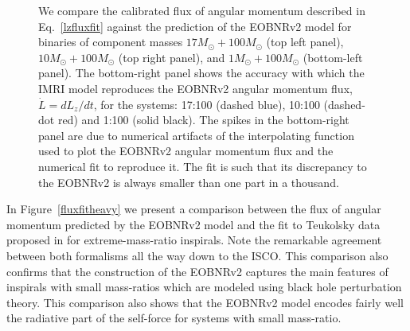 \begin{figure}[ht]
\caption{We compare the calibrated flux of angular momentum described in Eq.~\eqref{lzfluxfit} against the prediction of the EOBNRv2 model for binaries of component masses \(17M_{\odot} + 100M_{\odot}\) (top left panel),  \(10M_{\odot} + 100M_{\odot}\) (top right panel), and \(1M_{\odot} + 100M_{\odot}\) (bottom-left panel). The bottom-right panel shows the accuracy with which the IMRI model reproduces the EOBNRv2 angular momentum flux, \(\dot{L}=dL_z/dt\), for the systems: 17:100 (dashed blue), 10:100 (dashed-dot red) and 1:100 (solid black). The spikes in the bottom-right panel are due to numerical artifacts of the interpolating function used to plot the EOBNRv2 angular momentum flux and the numerical fit to reproduce it. The fit is such that its discrepancy to the EOBNRv2  is always smaller than one part in a thousand.}
\label{fluxfitlight}
\end{figure}


In Figure~\ref{fluxfitheavy} we present a comparison between the flux of angular momentum predicted by the EOBNRv2 model and the fit to Teukolsky data proposed in \cite{improved} for extreme-mass-ratio inspirals. Note the remarkable agreement between both formalisms all the way down to the ISCO. This comparison also confirms that the construction of the EOBNRv2 captures the main features of inspirals with small mass-ratios which are modeled using black hole perturbation theory. This comparison also shows that the EOBNRv2 model encodes fairly well the radiative part of the self-force for systems with small mass-ratio. 


